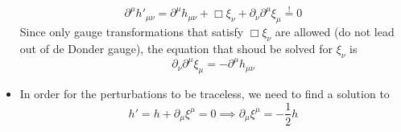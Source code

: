 \begin{itemize}
\begin{equation}
        \partial^\mu h'_{\mu\nu} = \partial^\mu h_{\mu\nu} + \Box \xi_\nu + \partial_\nu \partial^\mu \xi_\mu \overset{!}{=} 0
    \end{equation}
    Since only gauge transformations that satisfy $\Box \xi_\nu$ are allowed (do not lead out of de Donder gauge), the equation that shoud
    be solved for $\xi_\nu$ is
    \begin{equation}
        \partial_\nu \partial^\mu \xi_\mu = - \partial^\mu h_{\mu\nu}
    \end{equation}
    \item In order for the perturbations to be traceless, we need to find a solution to
    \begin{equation}
        h' = h + \partial_\mu \xi^\mu = 0 \implies \partial_\mu \xi^\mu =
        -\frac{1}{2}h
    \end{equation}
\end{itemize}
% 
